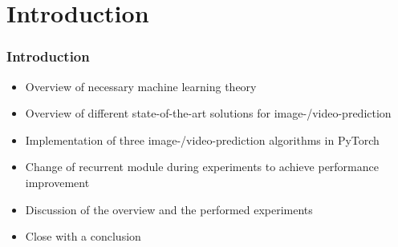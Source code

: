 \section{Introduction} 
 \begin{frame}
  \frametitle{Introduction}
  
  \begin{itemize}
   \item<1-> Overview of necessary machine learning theory
   \item<2-> Overview of different state-of-the-art solutions for image-/video-prediction
   \item<3-> Implementation of three image-/video-prediction algorithms in PyTorch \cite{Paszke2019}
   \item<4-> Change of recurrent module during experiments to achieve performance improvement
   \item<5-> Discussion of the overview and the performed experiments
   \item<6-> Close with a conclusion
  \end{itemize}
  
 \end{frame}